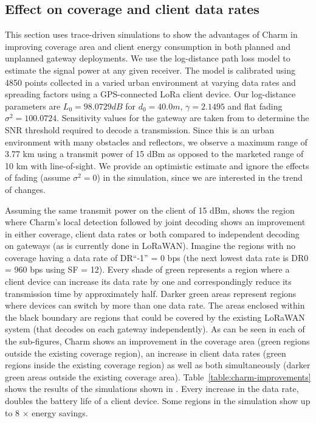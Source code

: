 \subsection{Effect on coverage and client data rates}
\label{sec:coverage-data-rate-improvement}

This section uses trace-driven simulations to show the advantages of Charm in improving coverage area and client energy consumption in both planned and unplanned gateway deployments. We use the log-distance path loss model to estimate the signal power at any given receiver. The model is calibrated using 4850 points collected in a varied urban environment at varying data rates and spreading factors using a GPS-connected LoRa client device. Our log-distance parameters are $L_0  = 98.0729 dB$ for $d_0 = 40.0 m$, $\gamma = 2.1495$ and flat fading $\sigma^2 = 100.0724$. Sensitivity values for the gateway are taken from \cite{Bor2016} to determine the SNR threshold required to decode a transmission. Since this is an urban environment with many obstacles and reflectors, we observe a maximum range of 3.77 km using a transmit power of 15 dBm as opposed to the marketed range of 10 km with line-of-sight. We provide an optimistic estimate and ignore the effects of fading (assume $\sigma^2 = 0$) in the simulation, since we are interested in the trend of changes.

Assuming the same transmit power on the client of 15 dBm,  shows the region where Charm's local detection followed by joint decoding shows an improvement in either coverage, client data rates or both compared to independent decoding on gateways (as is currently done in LoRaWAN). Imagine the regions with no coverage having a data rate of DR``-1'' = 0 bps (the next lowest data rate is DR0 = 960 bps using SF = 12). Every shade of green represents a region where a client device can increase its data rate by one and correspondingly reduce its transmission time by approximately half. Darker green areas represent regions where devices can switch by more than one data rate. The areas enclosed within the black boundary are regions that could be covered by the existing LoRaWAN system (that decodes on each gateway independently). As can be seen in each of the sub-figures, Charm shows an improvement in the coverage area (green regions outside the existing coverage region), an increase in client data rates (green regions inside the existing coverage region) as well as both simultaneously (darker green areas outside the existing coverage area). Table~\ref{table:charm-improvements} shows the results of the simulations shown in . Every increase in the data rate, doubles the battery life of a client device. Some regions in the simulation show up to 8 $\times$ energy savings.

